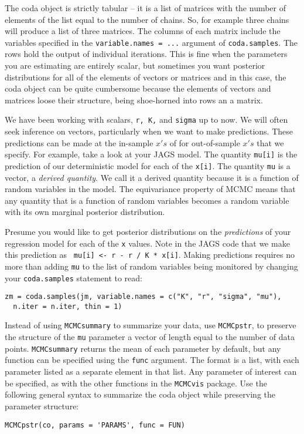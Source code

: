 \documentclass[12pt,english]{article}
\begin{document}
The coda object is strictly tabular -- it is a list of matrices with the number of elements of the list equal to the number of chains. So, for example three chains will produce a list of three matrices.  The columns of  each matrix include the variables specified in the \texttt{variable.names = ...} argument of \texttt{coda.samples}. The rows hold the output of individual iterations. This is fine when the parameters you are estimating are entirely scalar, but sometimes you want posterior distributions for all of the elements of vectors or matrices and in this case, the coda object can be quite cumbersome because the elements of vectors and matrices loose their structure, being shoe-horned into rows an a matrix.

We have been working with scalars, \texttt{r, K,} and \texttt{sigma} up to now.  We will often seek inference on vectors, particularly when we want to make predictions.  These predictions can be made at the in-sample $x's$ of for out-of-sample $x's$ that we specify. For example, take a look at your JAGS model.  The quantity \texttt{mu[i]} is the prediction of our deterministic model for each of the \texttt{x[i]}.  The quantity \texttt{mu} is a vector, a \emph{derived quantity}.  We call it a derived quantity because it is a function of random variables in the model. The equivariance property of MCMC means that any quantity that is a function of random variables becomes a random variable with its own marginal posterior distribution.

Presume you would like to get posterior distributions on the \emph{predictions} of your regression model for each of the \texttt{x} values. Note in the JAGS code that we make this prediction as \texttt{ mu[i] <- r - r / K * x[i]}. Making predictions requires no more than adding \texttt{mu} to the list of random variables being monitored by changing your \texttt{coda.samples} statement to read:

\begin{Verbatim}
zm = coda.samples(jm, variable.names = c("K", "r", "sigma", "mu"), 
  n.iter = n.iter, thin = 1)
\end{Verbatim}

\noindent Instead of using \texttt{MCMCsummary} to summarize your data, use \texttt{MCMCpstr}, to preserve the structure of the \texttt{mu} parameter a vector of length equal to the number of data points. \texttt{MCMCsummary} returns the mean of each parameter by default, but any function can be specified using the \texttt{func} argument. The format is a list, with each parameter listed as a separate element in that list.  Any parameter of interest can be specified, as with the other functions in the \texttt{MCMCvis} package. Use the following general syntax  to summarize the coda object while preserving the parameter structure:
\begin{Verbatim}
MCMCpstr(co, params = 'PARAMS', func = FUN)
\end{Verbatim}
\end{document}
